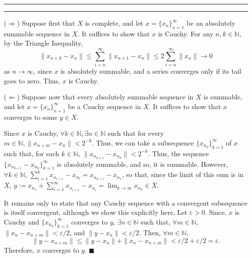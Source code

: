 \documentclass[11pt]{article}
\newcounter{questionCounter}
\newcounter{partCounter}[questionCounter]
\newenvironment{question}[2][\arabic{questionCounter}]{%
    \setcounter{partCounter}{0}%
    \vspace{.25in} \hrule \vspace{0.5em}%
        \noindent{\bf #2}%
    \vspace{0.8em} \hrule \vspace{.10in}%
    \addtocounter{questionCounter}{1}%
}{}
\renewcommand{\qed}{\quad $\blacksquare$}
\newcommand{\N}{\mathbb{N}} %
\newcommand{\e}{\varepsilon} %
\begin{document}
\newpage
\begin{question}{Problem 9}
($\Rightarrow$) Suppose first that $X$ is complete, and let
$x = \{x_n\}_{n = 1}^{\infty}$ be an absolutely summable sequence in $X$.
It suffices to show that $x$ is Cauchy. For any $n,k \in \N$, by the Triangle
Inequality,
\[
\|x_{n+k} - x_n\| \leq \sum_{i = n}^{\infty}\|x_{n + 1} - x_n \| \leq 2\sum_{i
= n}^{\infty}\|x_n\| \rightarrow 0
\]
as $n \rightarrow \infty$, since $x$ is absolutely summable, and a series
converges only if its tail goes to zero. Thus, $x$ is Cauchy. 

($\Leftarrow$) Suppose now that every absolutely summable sequence in $X$ is
summable, and let $x = \{x_n\}_{n = 1}^{\infty}$ be a Cauchy sequence in $X$.
It suffices to show that $x$ converges to some $y \in X$.

Since $x$ is Cauchy, $\forall k \in \N, \exists n \in \N$ such that for every
$m \in \N, \|x_{n + m} - x_n\| < 2^{-k}$. Thus, we can take a subsequence
$\{x_{n_k}\}_{k = 1}^{\infty}$ of $x$ such that, for each $k \in \N$, $\|x_{n_{k
+ 1}} - x_{n_k}\| < 2^{-k}$. Thus, the sequence
$\{x_{n_{k + 1}} - x_{n_k}\}_{k = 1}^{\infty}$ is absolutely summable, and so,
it is summable. However, $\forall k \in \N$, $\sum_{i = 1}^k x_{n_{i + 1}} -
x_{n_i} = x_{n_{k + 1}} - x_{n_1}$, so that, since the limit of this sum is in
$X$, $y := x_{n_1} + \sum_{i = 1}^{\infty} x_{n_{i + 1}} - x_{n_i} =
\lim_{k \rightarrow \infty}x_{n_k} \in X$.  

It remains only to state that any Cauchy sequence with a convergent
subsequence is itself convergent, although we show this explicitly here.
Let $\e > 0$. Since, $x$ is Cauchy and $\{x_{n_k}\}_{k = 1}^{\infty}$
converges to $y$, $\exists n \in \N$ such that, $\forall m \in \N$, $\|x_n -
x_{n + m}\| < \e/2$, and $\|y - x_n\| < \e/2$. Then, $\forall m \in \N$,
\[
 \|y - x_{n + m}\| 
 \leq \|y - x_n\| + \|x_n - x_{n + m}\|
 < \e/2 + \e/2
 = \e.
\]
Therefore, $x$ converges to $y$. \qed
\end{question}
\end{document}
